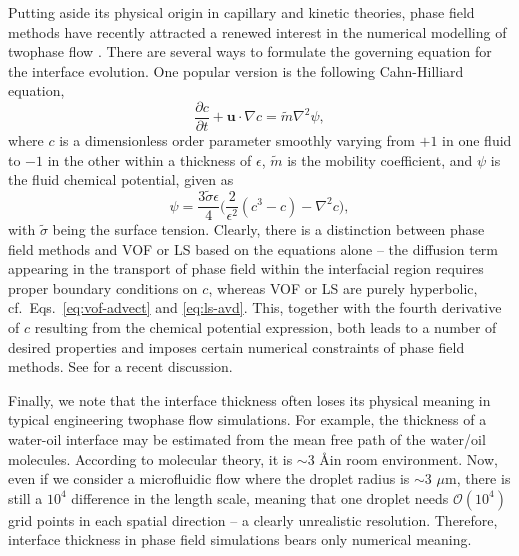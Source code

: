 Putting aside its physical origin in capillary and kinetic theories, phase field methods have recently attracted a renewed interest in the numerical modelling of twophase flow \citep{jacqmin_1999a, Jacqmin2000, Badalassi_etal_2003, Ding_Spelt_Shu2007, Shen_Yang_2010, dong_shen_2012a, Wang_Shu_Shao_Wu_Niu_2015, Martin, Mirjalili_Ivey_Mani_2020}.
There are several ways to formulate the governing equation for the interface evolution. One popular version is the following Cahn-Hilliard equation,
\begin{equation} \label{eq:C-H}
  \frac{\partial c}{\partial t} + {\bm u}\cdot \nabla c =\tilde{m}\nabla ^2 \psi,
\end{equation}
where $c$ is a dimensionless order parameter smoothly varying from $+1$ in one fluid to $-1$ in the other within a thickness of $\epsilon$,
$\tilde{m}$ is the mobility coefficient,
and $\psi$ is the fluid chemical potential, given as
\begin{equation} \label{eq:ch-chem}
  \psi = \frac{3\tilde{\sigma} \epsilon}{4} 
  \bigg(\frac{2}{\epsilon^2}(c^3-c) -\nabla ^2 c \bigg),
\end{equation}
with $\tilde{\sigma}$ being the surface tension.
Clearly, there is a distinction between phase field methods and VOF or LS based on the equations alone --
the diffusion term appearing in the transport of phase field within the interfacial region requires proper boundary conditions on $c$, whereas VOF or LS are purely hyperbolic, cf.\ Eqs.\ \eqref{eq:vof-advect} and \eqref{eq:ls-avd}.
This, together with the fourth derivative of $c$ resulting from the chemical potential expression, both leads to a number of desired properties and imposes certain numerical constraints of phase field methods.
See \cite{Mirjalili_Ivey_Mani_2020} for a recent discussion.

Finally, we note that the interface thickness often loses its physical meaning in typical engineering twophase flow simulations. 
For example, the thickness of a water-oil interface may be estimated from the mean free path of the water/oil molecules. According to molecular theory, it is $\sim 3$ \AA \enspace in room environment. Now, even if we consider a microfluidic flow where the droplet radius is $\sim 3$ $\mu$m, there is still a $10^{4}$ difference in the length scale, meaning that one droplet needs $\mathcal{O}(10^{4})$ grid points in each spatial direction -- a clearly unrealistic resolution.
Therefore, interface thickness in phase field simulations bears only numerical meaning.


